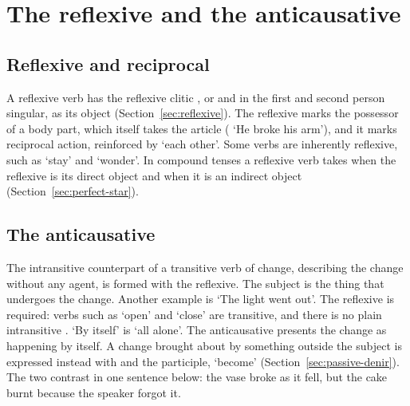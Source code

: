 \section{The reflexive and the anticausative}\label{sec:reflexive-middle}

\subsection{Reflexive and reciprocal}
A reflexive verb has the reflexive clitic , or  and  in the first and second person singular, as its object (Section~\ref{sec:reflexive}). The reflexive marks the possessor of a body part, which itself takes the article ( `He broke his arm'), and it marks reciprocal action, reinforced by  `each other'. Some verbs are inherently reflexive, such as  `stay' and  `wonder'. In compound tenses a reflexive verb takes  when the reflexive is its direct object and  when it is an indirect object (Section~\ref{sec:perfect-star}).

\subsection{The anticausative}\label{sec:anticausative}
The intransitive counterpart of a transitive verb of change, describing the change without any agent, is formed with the reflexive. The subject is the thing that undergoes the change.
Another example is  `The light went out'. The reflexive is required: verbs such as  `open' and  `close' are transitive, and there is no plain intransitive . `By itself' is  `all alone'.
The anticausative presents the change as happening by itself. A change brought about by something outside the subject is expressed instead with  and the participle, `become' (Section~\ref{sec:passive-denir}). The two contrast in one sentence below: the vase broke as it fell, but the cake burnt because the speaker forgot it.

